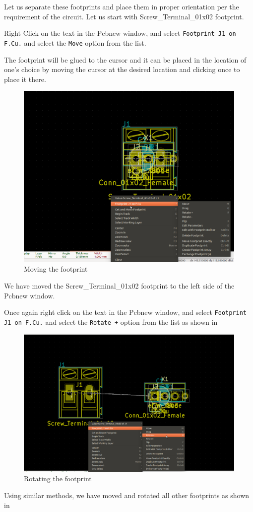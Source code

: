 \begin{compactenum}
\item Let us separate these footprints and place them in proper orientation per the requirement of the circuit. Let us start with Screw\_Terminal\_01x02 footprint.
\item Right Click on the text  in the Pcbnew window, and select \texttt{Footprint J1 on F.Cu.} and select the \texttt{Move} option from the list.
\item The footprint will be glued to the cursor and it can be placed in the location of one's choice by moving the cursor at the desired location and clicking once to place it there.
\begin{figure}
\centering
\includegraphics[height=0.4\textwidth]{FPMove.png}
\caption{Moving the footprint}
\label{movingFP}
\end{figure}
\item We have moved the Screw\_Terminal\_01x02 footprint to the left side of the Pcbnew window.
\item Once again right click on the text  in the Pcbnew window, and select \texttt{Footprint J1 on F.Cu.} and select the \texttt{Rotate +} option from the list as shown in 
\begin{figure}
\centering
\includegraphics[height=0.4\textwidth]{rotatefp.png}
\caption{Rotating the footprint}
\label{rotateFP}
\end{figure}
\item Using similar methods, we have moved and rotated all other footprints as shown in 


\end{compactenum}
